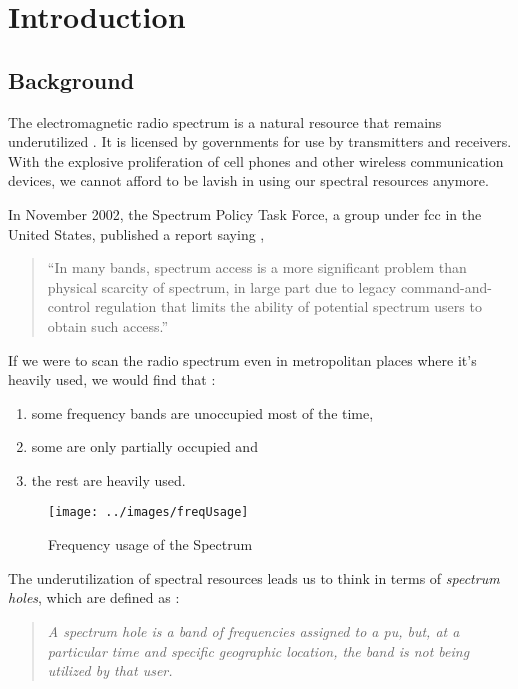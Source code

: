 \chapter{Introduction}
\thispagestyle{empty}
\section{Background}
The electromagnetic radio spectrum is a natural resource that remains 
underutilized \cite{haykin05}.
It is licensed by governments for use by transmitters and receivers.
With the explosive proliferation of cell phones and other wireless 
communication devices,
we cannot afford to be lavish in using our spectral resources anymore.

In November 2002, the Spectrum Policy Task Force, a group under \gls{fcc}
 in the United States, published a report saying
\cite{repFCC}, 
\begin{quote}
``In many bands, spectrum access is a more significant problem than physical 
scarcity of spectrum, in large part due to legacy command-and-control 
regulation that limits the ability of potential spectrum users to obtain such 
access.''
\end{quote}

If we were to scan the radio spectrum even in metropolitan places where it's
heavily used, 
we would find that \cite{staple04}:
\begin{enumerate}
	\item some frequency bands are unoccupied most of the time,
	\item some are only partially occupied and
	\item the rest are heavily used.
\end{enumerate}

\begin{figure}
\centering
\texttt{[image: ../images/freqUsage]}
\caption[Frequency usage of the Spectrum]{Frequency
usage of the Spectrum {\cite{kranthi13}}}
\label{freqUsage}
\end{figure}

The underutilization of spectral resources leads us to think in terms of 
\emph{spectrum holes}, which are defined as \cite{kolodzy01}:
\begin{quote}
\emph{A spectrum hole is a band of frequencies assigned to a \gls{pu}, 
but, at a particular time and specific geographic location, the band is not 
being utilized by that user.
}
\end{quote}


